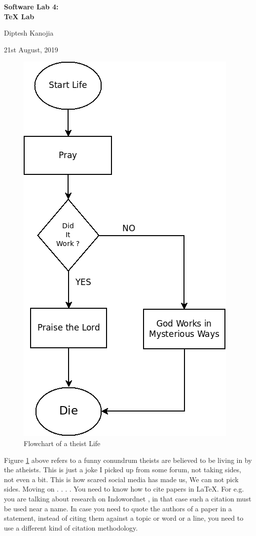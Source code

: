 \documentclass[12pt, a4paper]{article}
\begin{document}
 

\begin{titlepage}
\centering
    \vspace*{\fill}
    
    \vspace*{2.4cm}

    \Huge \textbf{Software Lab 4:\\TeX Lab}

    \vspace*{0.8cm}

    \LARGE{Diptesh Kanojia}
    \vspace*{0.5cm}

    \large{21st August, 2019}
    \vspace*{4.0cm}

    \vspace*{\fill}
\end{titlepage}

\begin{figure}[t!]
    \centering
    \includegraphics[width=\textwidth,height=\textwidth,keepaspectratio]{LifePray.png}
    \caption{Flowchart of a theist Life}
    \label{fig:lifepray}
\end{figure}

\normalfont
Figure \ref{fig:lifepray} above refers to a funny conundrum theists are believed to be living in by the atheists. This is just a joke I picked up from some forum, not taking sides, not even a bit. This is how scared social media has made us, We can not pick sides. Moving on . . . . You need to know how to cite papers in \LaTeX{}. For e.g. you are talking about research on Indowordnet \cite{pushpak2017}, in that case such a citation must be used near a name. In case you need to quote the authors of a paper in a statement, instead of citing them against a topic or word or a line, you need to use a different kind of citation methodology.
\end{document}
